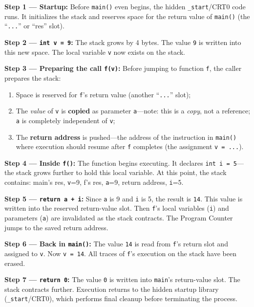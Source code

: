 \textbf{Step 1 --- Startup:} Before \texttt{main()} even begins, the hidden \texttt{\_start}/CRT0 code runs. It initializes the stack and reserves space for the return value of \texttt{main()} (the ``\texttt{...}'' or ``res'' slot).

\textbf{Step 2 --- \texttt{int v = 9}:} The stack grows by 4 bytes. The value \texttt{9} is written into this new space. The local variable \texttt{v} now exists on the stack.

\textbf{Step 3 --- Preparing the call \texttt{f(v)}:} Before jumping to function \texttt{f}, the caller prepares the stack:
\begin{enumerate}
    \item Space is reserved for \texttt{f}'s return value (another ``\texttt{...}'' slot);
    \item The \emph{value} of \texttt{v} is \textbf{copied} as parameter \texttt{a}---note: this is a \emph{copy}, not a reference; \texttt{a} is completely independent of \texttt{v};
    \item The \textbf{return address} is pushed---the address of the instruction in \texttt{main()} where execution should resume after \texttt{f} completes (the assignment \texttt{v = ...}).
\end{enumerate}

\textbf{Step 4 --- Inside \texttt{f()}:} The function begins executing. It declares \texttt{int i = 5}---the stack grows further to hold this local variable. At this point, the stack contains: main's res, \texttt{v}=9, f's res, \texttt{a}=9, return address, \texttt{i}=5.

\textbf{Step 5 --- \texttt{return a + i}:} Since \texttt{a} is 9 and \texttt{i} is 5, the result is \texttt{14}. This value is written into the reserved return-value slot. Then \texttt{f}'s local variables (\texttt{i}) and parameters (\texttt{a}) are invalidated as the stack contracts. The Program Counter jumps to the saved return address.

\textbf{Step 6 --- Back in \texttt{main()}:} The value \texttt{14} is read from \texttt{f}'s return slot and assigned to \texttt{v}. Now \texttt{v = 14}. All traces of \texttt{f}'s execution on the stack have been erased.

\textbf{Step 7 --- \texttt{return 0}:} The value \texttt{0} is written into \texttt{main}'s return-value slot. The stack contracts further. Execution returns to the hidden startup library (\texttt{\_start}/CRT0), which performs final cleanup before terminating the process.

